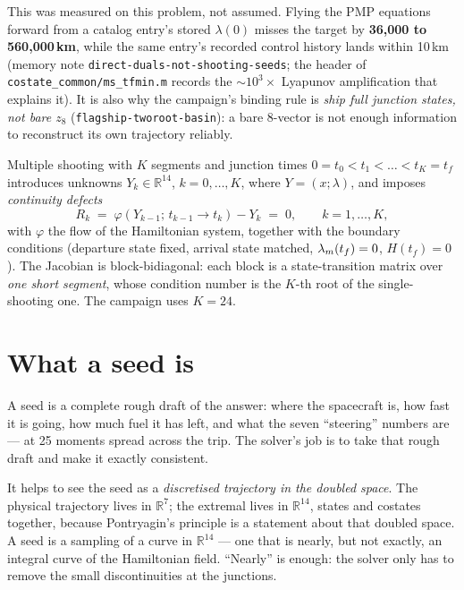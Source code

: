 \documentclass[11pt]{article}
\newcommand{\tf}{t_f}\newcommand{\R}{\mathbb{R}}
\newcommand{\file}[1]{\texttt{#1}}
\begin{document}
\begin{meas}
This was measured on this problem, not assumed. Flying the PMP equations
forward from a catalog entry's stored $\lambda(0)$ misses the target by
\textbf{36{,}000 to 560{,}000\,km}, while the same entry's recorded control
history lands within 10\,km
(memory note \file{direct-duals-not-shooting-seeds}; the header of
\file{costate\_common/ms\_tfmin.m} records the $\sim\!10^3\times$ Lyapunov
amplification that explains it). It is also why the campaign's binding rule
is \emph{ship full junction states, not bare $z_8$}
(\file{flagship-tworoot-basin}): a bare 8-vector is not enough information to
reconstruct its own trajectory reliably.
\end{meas}

\begin{rig}
Multiple shooting with $K$ segments and junction times
$0=t_0<t_1<\dots<t_K=\tf$ introduces unknowns
$Y_k \in \R^{14}$, $k=0,\dots,K$, where $Y = (x;\lambda)$, and imposes
\emph{continuity defects}
\[
R_k \;=\; \varphi\!\left(Y_{k-1};\, t_{k-1}\!\to\! t_k\right) - Y_k \;=\;0,
\qquad k = 1,\dots,K,
\]
with $\varphi$ the flow of the Hamiltonian system, together with the boundary
conditions (departure state fixed, arrival state matched, $\lm(\tf)=0$,
$H(\tf)=0$). The Jacobian is block-bidiagonal: each block is a
state-transition matrix over \emph{one short segment}, whose condition number
is the $K$-th root of the single-shooting one. The campaign uses $K=24$.
\end{rig}

\section{What a seed is}\label{sec:seed}

\begin{eli}
A seed is a complete rough draft of the answer: where the spacecraft is, how
fast it is going, how much fuel it has left, and what the seven ``steering''
numbers are --- at 25 moments spread across the trip. The solver's job is to
take that rough draft and make it exactly consistent.
\end{eli}

\begin{intu}
It helps to see the seed as a \emph{discretised trajectory in the doubled
space}. The physical trajectory lives in $\R^7$; the extremal lives in
$\R^{14}$, states and costates together, because Pontryagin's principle is a
statement about that doubled space. A seed is a sampling of a curve in
$\R^{14}$ --- one that is nearly, but not exactly, an integral curve of the
Hamiltonian field. ``Nearly'' is enough: the solver only has to remove the
small discontinuities at the junctions.
\end{intu}
\end{document}
